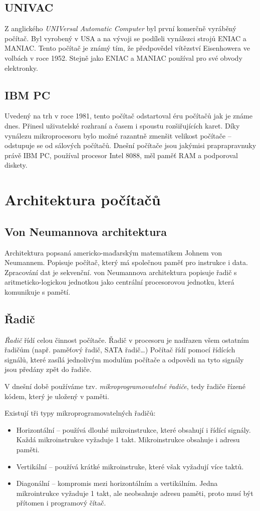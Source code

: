 \documentclass[a4paper]{article}
\begin{document}
    \subsection{UNIVAC}
        Z anglického \textit{UNIVersal Automatic Computer} byl první komerčně vyráběný počítač. Byl vyrobený v USA a na vývoji se podíleli vynálezci strojů ENIAC a MANIAC. Tento počítač je známý tím, že předpovědel vítězství Eisenhowera ve volbách v roce 1952. Stejně jako ENIAC a MANIAC používal pro své obvody elektronky.
    \subsection{IBM PC}
        Uvedený na trh v roce 1981, tento počítač odstartoval éru počítačů jak je známe dnes. Přinesl uživatelské rozhraní a časem i spoustu rozšiřujících karet. Díky vynálezu mikroprocesoru bylo možné razantně zmenšit velikost počítače -- odstupuje se od sálových počítačů. Dnešní počítače jsou jakýmisi praprapravnuky právě IBM PC, používal procesor Intel 8088, měl paměť RAM a podporoval diskety.

\newpage


\section{Architektura počítačů}
    \subsection{Von Neumannova architektura}
        Architektura popsaná americko-maďarským matematikem Johnem von Neumannem. Popisuje počítač, který má společnou paměť pro instrukce i data. Zpracování dat je sekvenční. von Neumannova architektura  popisuje řadič s aritmeticko-logickou jednotkou jako centrální procesorovou jednotku, která komunikuje s pamětí. 
    \subsection{Řadič}
        \textit{Řadič} řídí celou činnost počítače. Řadič v procesoru je nadřazen všem ostatním řadičům (např. paměťový řadič, SATA řadič\dots)
        Počítač řídí pomocí řídících signálů, které zasílá jednolivým modulům počítače a odpovědi na tyto signály jsou předány zpět do řadiče. \par
        V dnešní době používáme tzv. \textit{mikroprogramovatelné řadiče}, tedy řadiče řízené kódem, který je uložený v paměti. \par
        Existují tři typy mikroprogramovatelných řadičů:
        \begin{itemize}
            \item Horizontální -- používá dlouhé mikroinstrukce, které obsahují i řídící signály. Každá mikroinstrukce vyžaduje 1 takt. Mikroinstrukce obsahuje i adresu paměti.
            \item Vertikální -- používá krátké mikroinstruke, které však vyžadují více taktů.
            \item Diagonální -- kompromis mezi horizontálním a vertikálním. Jedna mikrointrukce vyžaduje 1 takt, ale neobsahuje adresu paměti, proto musí být přítomen i programový čítač.
        \end{itemize}
\end{document}
